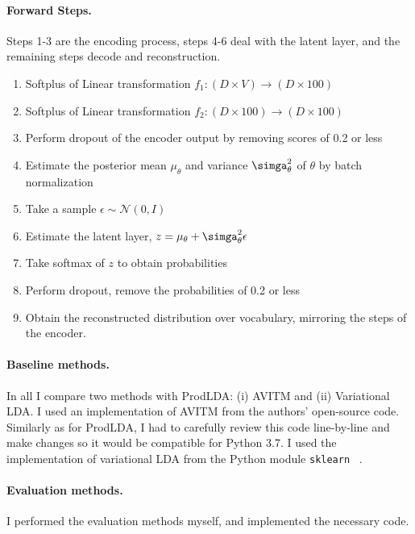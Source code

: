 \documentclass[10pt,twocolumn,letterpaper]{article}
\begin{document}
\paragraph{Forward Steps.}
Steps 1-3 are the encoding process, steps 4-6 deal with the latent layer, and the remaining steps decode and reconstruction.
\begin{enumerate}\itemsep0pt
    \item Softplus of Linear transformation $f_1: (D \times V) \to (D \times 100)$
    \item Softplus of Linear transformation $f_2: (D \times 100) \to (D \times 100)$
    \item Perform dropout of the encoder output by removing scores of 0.2 or less
    \item Estimate the posterior mean $\mu_{\theta}$ and variance $\simga_{\theta}^2$ of $\theta$ by batch normalization
    \item Take a sample $\epsilon \sim \mathcal{N}(0,I)$
    \item Estimate the latent layer, $z = \mu_{\theta} + \simga_{\theta}^2 \epsilon$
    \item Take softmax of $z$ to obtain probabilities
    \item Perform dropout, remove the probabilities of 0.2 or less
    \item Obtain the reconstructed distribution over vocabulary, mirroring the steps of the encoder.
\end{enumerate}

\paragraph{Baseline methods.} In all I compare two methods with ProdLDA: (i) AVITM and (ii) Variational LDA.
I used an implementation of AVITM from the authors' open-source code. 
Similarly as for ProdLDA, I had to carefully review this code line-by-line and make changes so it would be compatible for Python 3.7.
I used the implementation of variational LDA from the Python module \texttt{sklearn} ~\cite{sklearn_api,scikit-learn}. 

\paragraph{Evaluation methods.} I performed the evaluation methods myself, and implemented the necessary code.


\end{document}
